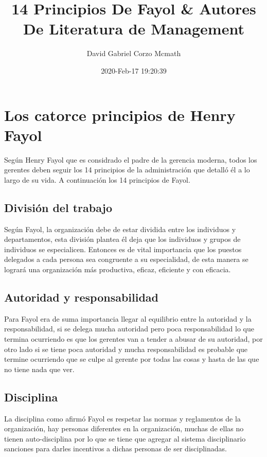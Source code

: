 \documentclass{article}
\title{14 Principios De Fayol \& Autores De Literatura de Management}
\author{David Gabriel Corzo Mcmath}
\date{2020-Feb-17 19:20:39}
\begin{document}
\maketitle

\section{Los catorce principios de Henry Fayol}
Según Henry Fayol que es considrado el padre de la gerencia moderna, todos los gerentes deben seguir los 14 principios de la administración que detalló él a lo largo de su vida. A continuación los 14 principios de Fayol.


\subsection{División del trabajo}
Según Fayol, la organización debe de estar dividida entre los individuos y departamentos, esta división plantea él deja que los individuos y grupos de individuos se especialicen. Entonces es de vital importancia que los puestos delegados a cada persona sea congruente a su especialidad, de esta manera se logrará una organización más productiva, eficaz, eficiente y con eficacia.


\subsection{Autoridad y responsabilidad}
Para Fayol era de suma importancia llegar al equilibrio entre la autoridad y la responsabilidad, si se delega mucha autoridad pero poca responsabilidad lo que termina ocurriendo es que los gerentes van a tender a abusar de su autoridad, por otro lado si se tiene poca autoridad y mucha responsabilidad es probable que termine ocurriendo que se culpe al gerente por todas las cosas y hasta de las que no tiene nada que ver. 


\subsection{Disciplina}
La disciplina como afirmó Fayol es respetar las normas y reglamentos de la organización, hay personas diferentes en la organización, muchas de ellas no tienen auto-disciplina por lo que se tiene que agregar al sistema disciplinario sanciones para darles incentivos a dichas personas de ser disciplinadas.
\end{document}
